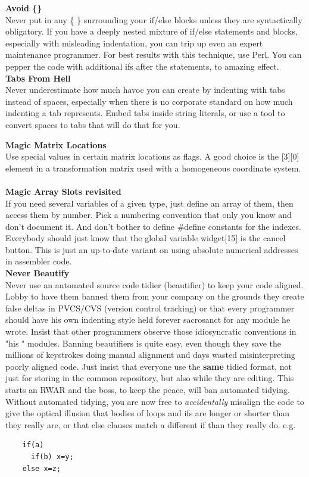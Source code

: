 \documentclass[11pt,twoside,a4paper]{article}
\begin{document}
\textbf{Avoid \{\}}~\\
Never put in any \{ \} surrounding your if/else blocks unless they are syntactically obligatory. If you have a deeply nested mixture of if/else statements and blocks, especially with misleading indentation, you can trip up even an expert maintenance programmer. For best results with this technique, use Perl. You can pepper the code with additional ifs after the statements, to amazing effect. ~\\

\textbf{Tabs From Hell}~\\
Never underestimate how much havoc you can create by indenting with tabs instead of spaces, especially when there is no corporate standard on how much indenting a tab represents. Embed tabs inside string literals, or use a tool to convert spaces to tabs that will do that for you. ~\\

\clearpage

\textbf{Magic Matrix Locations}~\\
Use special values in certain matrix locations as flags. A good choice is the [3][0] element in a transformation matrix used with a homogeneous coordinate system. ~\\

\textbf{Magic Array Slots revisited}~\\
If you need several variables of a given type, just define an array of them, then access them by number. Pick a numbering convention that only you know and don't document it. And don't bother to define \#define constants for the indexes. Everybody should just know that the global variable widget[15] is the cancel button. This is just an up-to-date variant on using absolute numerical addresses in assembler code. ~\\

\textbf{Never Beautify}~\\
Never use an automated source code tidier (beautifier) to keep your code aligned. Lobby to have them banned them from your company on the grounds they create false deltas in PVCS/CVS (version control tracking) or that every programmer should have his own indenting style held forever sacrosanct for any module he wrote. Insist that other programmers observe those idiosyncratic conventions in "his " modules. Banning beautifiers is quite easy, even though they save the millions of keystrokes doing manual alignment and days wasted misinterpreting poorly aligned code. Just insist that everyone use the \textbf{same} tidied format, not just for storing in the common repository, but also while they are editing. This starts an RWAR and the boss, to keep the peace, will ban automated tidying. Without automated tidying, you are now free to \emph{accidentally} misalign the code to give the optical illusion that bodies of loops and ifs are longer or shorter than they really are, or that else clauses match a different if than they really do. e.g. 
\begin{verbatim}
	if(a)
	  if(b) x=y;
	else x=z;
\end{verbatim}
\end{document}
